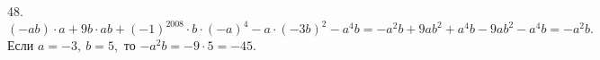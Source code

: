 48. $(-ab)\cdot a+9b\cdot ab+(-1)^{2008}\cdot b\cdot(-a)^4-a\cdot (-3b)^2-a^4b=-a^2b+9ab^2+a^4b-9ab^2-a^4b=-a^2b.$ Если $a=-3,\ b=5,$ то
$-a^2b=-9\cdot5=-45.$\\
